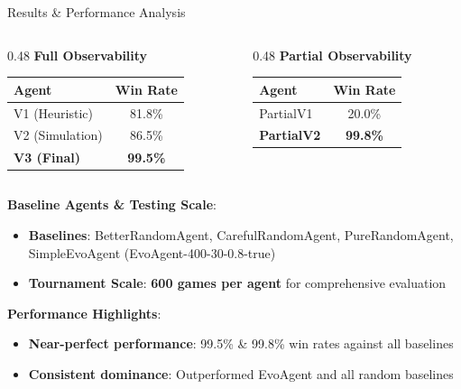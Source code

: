 \documentclass{beamer}
\begin{document}
\begin{frame}{Results \& Performance Analysis}
  \begin{columns}
  \begin{column}{0.48\textwidth}
    \textbf{Full Observability}
    \begin{table}[h]
    \small
    \begin{tabular}{|l|c|}
    \hline
    \textbf{Agent} & \textbf{Win Rate} \\
    \hline
    V1 (Heuristic) & 81.8\% \\
    V2 (Simulation) & 86.5\% \\
    \textbf{V3 (Final)} & \textbf{99.5\%} \\
    \hline
    \end{tabular}
    \end{table}
  \end{column}
  \begin{column}{0.48\textwidth}
    \textbf{Partial Observability}
    \begin{table}[h]
    \small
    \begin{tabular}{|l|c|}
    \hline
    \textbf{Agent} & \textbf{Win Rate} \\
    \hline
    PartialV1 & 20.0\% \\
    \textbf{PartialV2} & \textbf{99.8\%} \\
    \hline
    \end{tabular}
    \end{table}
  \end{column}
  \end{columns}
  
  \vspace{0.3cm}
  \textbf{Baseline Agents \& Testing Scale}:
  \begin{itemize}
    \item \textbf{Baselines}: BetterRandomAgent, CarefulRandomAgent, PureRandomAgent, SimpleEvoAgent (EvoAgent-400-30-0.8-true)
    \item \textbf{Tournament Scale}: \textbf{600 games per agent} for comprehensive evaluation
  \end{itemize}
  
  \textbf{Performance Highlights}:
  \begin{itemize}
    \item \textbf{Near-perfect performance}: 99.5\% \& 99.8\% win rates against all baselines
    \item \textbf{Consistent dominance}: Outperformed EvoAgent and all random baselines
  \end{itemize}
\end{frame}
\end{document}
